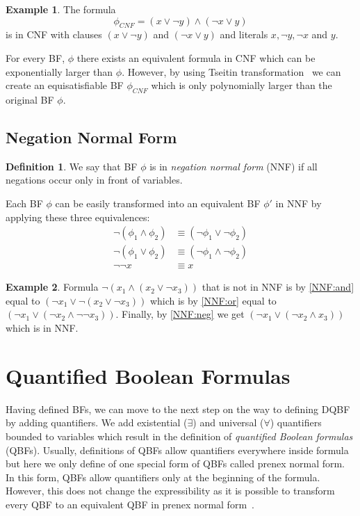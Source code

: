 \documentclass[
  digital, %
  color,
  twoside, %
  table,   %
  nolof,     %
  nolot,     %
]{fithesis3}
\theoremstyle{definition}
\newtheorem{definition}{Definition}
\newtheorem{example}{Example}
\theoremstyle{remark}
\begin{document}
\begin{example}
The formula
\[\phi_{CNF} = (x \lor \neg y) \land (\neg x \lor y)\]
is in CNF with clauses $(x \lor \neg y)$ and $(\neg x \lor y)$ and literals $x,\neg y, \neg x$ and $y$.
\end{example}

For every BF, $\phi$ there exists an equivalent formula in CNF which can be exponentially larger than $\phi$. However, by using Tseitin transformation~\cite{Tseitin} we can create an equisatisfiable BF $\phi_{CNF}$ which is only polynomially larger than the original BF $\phi$.

\subsection{Negation Normal Form}
\label{sec:BF:NNF}
\begin{definition}
  We say that BF $\phi$ is in \emph{negation normal form} (NNF) if all negations occur only in front of variables.
\end{definition}
Each BF $\phi$ can be easily transformed into an equivalent BF $\phi'$ in NNF by applying these three equivalences:
\begin{align}
    \neg(\phi_1 \land \phi_2) &\equiv (\neg\phi_1 \lor \neg\phi_2) \label{NNF:and} \\
    \neg(\phi_1 \lor \phi_2) &\equiv (\neg\phi_1 \land \neg\phi_2) \label{NNF:or}\\
    \neg\neg x &\equiv x \label{NNF:neg}
\end{align}
\begin{example}
Formula $\neg (x_1 \land (x_2 \lor \neg x_3))$ that is not in NNF is by \eqref{NNF:and} equal to $(\neg x_1 \lor \neg(x_2 \lor \neg x_3))$ which is by \eqref{NNF:or} equal to $(\neg x_1 \lor (\neg x_2 \land \neg\neg x_3))$. Finally, by \eqref{NNF:neg} we get $(\neg x_1 \lor (\neg x_2 \land x_3))$ which is in NNF.
\end{example}

\section{Quantified Boolean Formulas}
Having defined BFs, we can move to the next step on the way to defining DQBF by adding quantifiers. We add existential (${\exists}$) and universal (${\forall}$) quantifiers bounded to variables which result in the definition of \emph{quantified Boolean formulas} (QBFs). Usually, definitions of QBFs allow quantifiers everywhere inside formula but here we only define of one special form of QBFs called prenex normal form. In this form, QBFs allow quantifiers only at the beginning of the formula. However, this does not change the expressibility as it is possible to transform every QBF to an equivalent QBF in prenex normal form~\cite{prenexingQBFs}.
\end{document}
